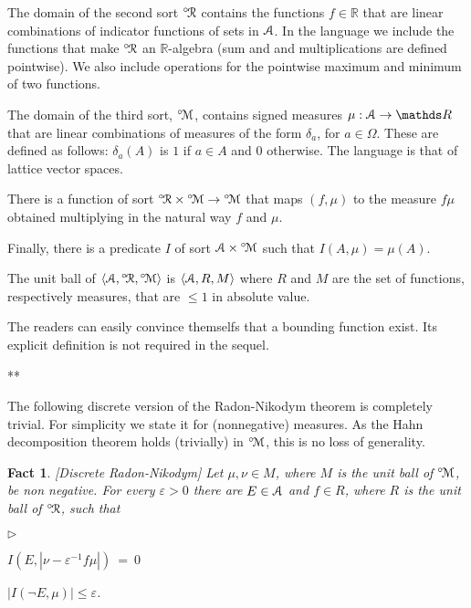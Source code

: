 \documentclass[12pt,letterpaper,oneside,reqno]{amsart}
\newcommand{\mylabel}[1]{{#1}\hfill}
\renewenvironment{itemize}
  {\begin{list}{$\triangleright$}{%
   \setlength{\parskip}{0mm}
   \setlength{\topsep}{.2\baselineskip}
   \setlength{\rightmargin}{0mm}
   \setlength{\listparindent}{0mm}
   \setlength{\itemindent}{0mm}
   \setlength{\labelwidth}{3ex}
   \setlength{\itemsep}{.2\baselineskip}
   \setlength{\parsep}{.2\baselineskip}
   \setlength{\partopsep}{0mm}
   \setlength{\labelsep}{1ex}
   \setlength{\leftmargin}{\labelwidth+\labelsep}
   \let\makelabel\mylabel}}{%
   \end{list}}
\theoremstyle{plain}
\newtheorem{fact}[theorem]{Fact}
\theoremstyle{remark}
\begin{document}

The domain of the second sort ${}^{\circ\!}{\EuScript R}$ contains the functions $f\in{\mathds R}$ that are linear combinations of indicator functions of sets in ${\EuScript A}$.
In the language we include the functions that make ${}^{\circ\!}{\EuScript R}$ an ${\mathds R}$-algebra (sum and and multiplications are defined pointwise).
We also include operations for the pointwise maximum and minimum of two functions.

The domain of the third sort, ${}^{\circ\!}{\EuScript M}$, contains signed measures $\mu:{\EuScript A}\to{\mathds R}$ that are linear combinations of measures of the form $\delta_a$, for $a\in\Omega$.
These are defined as follows: $\delta_a(A)$ is $1$ if $a\in A$ and $0$ otherwise.
The language is that of lattice vector spaces.

There is a function of sort ${}^{\circ\!}{\EuScript R}\times{}^{\circ\!}{\EuScript M}\to{}^{\circ\!}{\EuScript M}$ that maps $(f,\mu)$ to the measure $f\mu$ obtained multiplying in the natural way $f$ and $\mu$.

Finally, there is a predicate $I$ of sort ${\EuScript A}\times{}^{\circ\!}{\EuScript M}$ such that $I(A,\mu)=\mu(A)$.

The unit ball of $\langle{\EuScript A},{}^{\circ\!}{\EuScript R},{}^{\circ\!}{\EuScript M}\rangle$ is $\langle{\EuScript A},R,M\rangle$ where $R$ and $M$ are the set of functions, respectively measures,  that are $\le1$ in absolute value.

The readers can easily convince themselfs that a bounding function exist.
Its explicit definition is not required in the sequel.

\hfil ***

The following discrete version of the Radon-Nikodym theorem is completely trivial.
For simplicity we state it for (nonnegative) measures.
As the Hahn decomposition theorem holds (trivially) in ${}^{\circ\!}{\EuScript M}$, this is no loss of generality.

\begin{fact}\label{thm_fRN}
  [Discrete Radon-Nikodym]
  Let $\mu,\nu\in M$, where $M$ is the unit ball of ${}^{\circ\!}{\EuScript M}$, be non negative.
  For every $\varepsilon > 0$ there are $E\in{\EuScript A}$ and $f\in R$, where $R$ is the unit ball of ${}^{\circ\!}{\EuScript R}$, such that
  \begin{itemize}
    \item[1.] $I(E,|\nu-\varepsilon^{-1}f\mu|)\ =\ 0$
    \item[2.] $|I(\neg E, \mu)|\le\varepsilon$.
  \end{itemize}
\end{fact}
\end{document}
